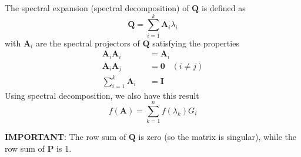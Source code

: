 \begin{framed}
The spectral expansion (spectral decomposition) of $\mathbf{Q}$ is defined as
\begin{equation}
\mathbf{Q} = \sum_{i=1}^{k}\mathbf{A}_i\lambda_i
\end{equation}
with $\mathbf{A}_i$ are the spectral projectors of
$\mathbf{Q}$ satisfying the properties
\begin{eqnarray}
\mathbf{A}_i \mathbf{A}_i &&= \mathbf{A}_i \\
\mathbf{A}_i \mathbf{A}_j &&= \mathbf{0} \;\;\; (i\ne j) \\
\sum_{i=1}^{k} \mathbf{A}_i &&= \mathbf{I}
\end{eqnarray}
Using spectral decomposition, we also have this result
\begin{equation}
f(\mathbf{A}) = \sum_{k=1}^n f(\lambda_k)G_i
\end{equation}
\end{framed}

{\bf IMPORTANT}: The row sum of $\mathbf{Q}$ is zero (so the matrix is
singular), while the row sum of $\mathbf{P}$ is 1.

